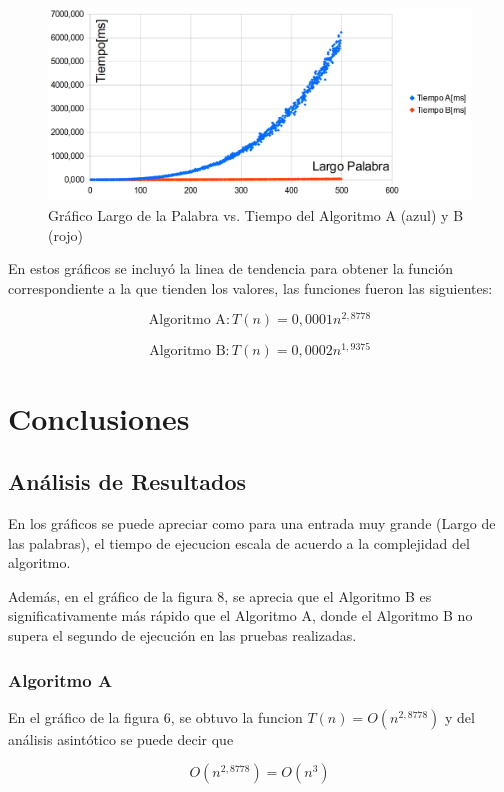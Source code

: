 \documentclass[12pt]{article}
\begin{document}
\begin{figure}[htbp]
    \centering
    \includegraphics[width=\textwidth]{Grafico3.png}
    \caption{Gráfico Largo de la Palabra vs. Tiempo del Algoritmo A (azul) y B (rojo)}
\end{figure}

\newpage
En estos gráficos se incluyó la linea de tendencia para obtener la función correspondiente a la que tienden los valores, las funciones fueron las siguientes:

$$\text{Algoritmo A}: T(n) = 0,0001n^{2,8778}$$

$$\text{Algoritmo B}: T(n) = 0,0002n^{1,9375}$$

\newpage
\section{Conclusiones}

\subsection{Análisis de Resultados}

En los gráficos se puede apreciar como para una entrada muy grande (Largo de las palabras), el tiempo de ejecucion escala de acuerdo a la complejidad del algoritmo.

Además, en el gráfico de la figura 8, se aprecia que el Algoritmo B es significativamente más rápido que el Algoritmo A, donde el Algoritmo B no supera el segundo de ejecución en las pruebas realizadas.

\subsubsection{Algoritmo A}
En el gráfico de la figura 6, se obtuvo la funcion $T(n) = O(n^{2,8778})$ y del análisis asintótico se puede decir que

$$O(n^{2,8778}) = O(n^3)$$
\end{document}
